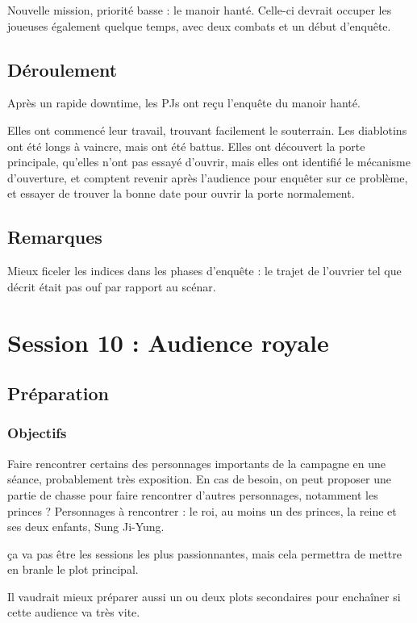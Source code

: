 \documentclass[10pt,a4paper]{book}
\begin{document}
Nouvelle mission, priorité basse : le manoir hanté. Celle-ci devrait occuper les joueuses également quelque temps, avec deux combats et un début d'enquête.
\subsection{Déroulement}
Après un rapide downtime, les PJs ont reçu l'enquête du manoir hanté.

Elles ont commencé leur travail, trouvant facilement le souterrain. Les diablotins ont été longs à vaincre, mais ont été battus. Elles ont découvert la porte principale, qu'elles n'ont pas essayé d'ouvrir, mais elles ont identifié le mécanisme d'ouverture, et comptent revenir après l'audience pour enquêter sur ce problème, et essayer de trouver la bonne date pour ouvrir la porte normalement.
\subsection{Remarques}

Mieux ficeler les indices dans les phases d'enquête : le trajet de l'ouvrier tel que décrit était pas ouf par rapport au scénar.
\section{Session 10 : Audience royale}
\subsection{Préparation}
\subsubsection{Objectifs}
Faire rencontrer certains des personnages importants de la campagne en une séance, probablement très exposition. En cas de besoin, on peut proposer une partie de chasse pour faire rencontrer d'autres personnages, notamment les princes ? Personnages à rencontrer : le roi, au moins un des princes, la reine et ses deux enfants, Sung Ji-Yung.

ça va pas être les sessions les plus passionnantes, mais cela permettra de mettre en branle le plot principal.

Il vaudrait mieux préparer aussi un ou deux plots secondaires pour enchaîner si cette audience va très vite. 
\end{document}
